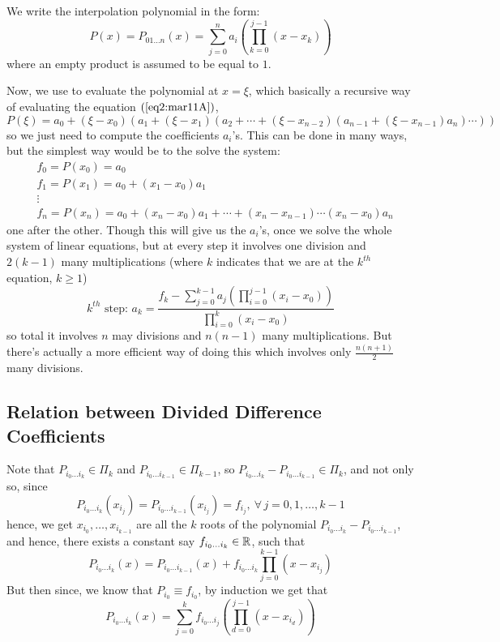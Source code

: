 We write the interpolation polynomial in the form:
\begin{equation}\label{eq2:mar11A}
    P(x) = P_{01\dots n}(x) = \sum_{j=0}^n a_i \left(\prod_{k=0}^{j-1} (x-x_k)\right)
\end{equation}
where an empty product is assumed to be equal to $1$. 

Now, we use  to evaluate the polynomial at $x = \xi$, which basically a recursive way of evaluating the equation $(\ref{eq2:mar11A})$,
\begin{equation}\label{eq3:mar11A}
    P(\xi) = a_0 + (\xi - x_0)\left( a_1 + (\xi - x_1)\left(  a_2 + \cdots + (\xi - x_{n-2})\left( a_{n-1} + (\xi - x_{n-1})a_n \right) \cdots \right) \right)
\end{equation}
so we just need to compute the coefficients $a_i$'s. This can be done in many ways, but the simplest way would be to the solve the system:
\begin{align*}
    &f_0 = P(x_0) = a_0 \\ 
    &f_1 = P(x_1) = a_0 + (x_1 - x_0)a_1 \\ 
    &\vdots \\
    &f_n = P(x_n) = a_0 + (x_n - x_0)a_1 +\cdots+ (x_n-x_{n-1})\cdots(x_n - x_0)a_n
\end{align*}
one after the other. Though this will give us the $a_i$'s, once we solve the whole system of linear equations, but at every step it involves one division and $2(k-1)$ many multiplications (where $k$ indicates that we are at the $k^{th}$ equation, $k \geq 1$)
\[
  k^{th}\mbox{ step: } a_k = \frac{f_k - \sum_{j=0}^{k-1}a_j \left(\prod_{i=0}^{j-1}(x_i-x_0)\right)}{\prod_{i=0}^k (x_i - x_0)}
\]
so total it involves $n$ may divisions and $n(n-1)$ many multiplications. But there's actually a more efficient way of doing this which involves only $\frac{n(n+1)}{2}$ many divisions.

\subsection{Relation between Divided Difference Coefficients}

Note that $P_{i_0\dots i_k} \in \Pi_k$ and $P_{i_0 \dots i_{k-1}} \in \Pi_{k-1}$, so $P_{i_0 \dots i_k} - P_{i_0 \dots i_{k-1}} \in \Pi_k$, and not only so, since 
\[
    P_{i_0 \dots i_k}(x_{i_j}) = P_{i_0 \dots i_{k-1}}(x_{i_j}) = f_{i_j}, \ \forall \, j = 0,1,\dots,k-1
\]  
hence, we get $x_{i_0}, \dots, x_{i_{k-1}}$ are all the $k$ roots of the polynomial $P_{i_0 \dots i_k} - P_{i_0\dots i_{k-1}}$, and hence, there exists a constant say $f_{i_0\dots i_k} \in \mathbb{R}$, such that 
\[
    P_{i_0\dots i_k}(x) = P_{i_0 \dots i_{k-1}}(x) + f_{i_0\dots i_k} \prod_{j=0}^{k-1} (x - x_{i_j})  
\]
But then since, we know that $P_{i_0} \equiv f_{i_0}$, by induction we get that 
\begin{equation}\label{eq4:mar11A}
    P_{i_0 \dots i_k}(x) = \sum_{j=0}^k f_{i_0 \dots i_j} \left(\prod_{d=0}^{j-1}(x-x_{i_d}) \right)
\end{equation} 

